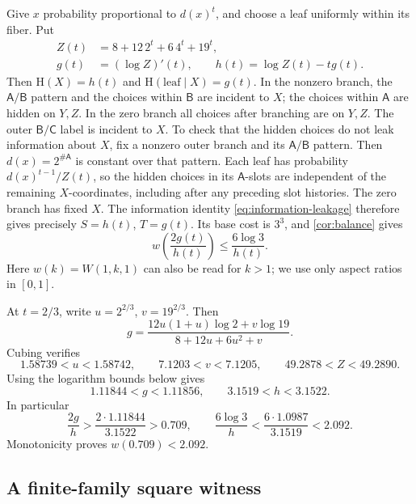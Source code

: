 \documentclass[11pt]{article}
\numberwithin{equation}{section}
\theoremstyle{definition}
\theoremstyle{remark}
\newcommand{\HH}{\mathrm H}
\newcommand{\colA}{\mathsf A}
\newcommand{\colB}{\mathsf B}
\newcommand{\colC}{\mathsf C}
\begin{document}
Give \(x\) probability proportional to \(d(x)^t\), and choose a leaf
uniformly within its fiber.
Put
\begin{equation}\label{eq:curve-functions}
 \begin{split}
 Z(t)&=8+12\,2^t+6\,4^t+19^t,\\
 g(t)&=(\log Z)'(t),\qquad h(t)=\log Z(t)-tg(t).
 \end{split}
\end{equation}
Then \(\HH(X)=h(t)\) and \(\HH(\text{leaf}\mid X)=g(t)\).
In the nonzero branch, the \(\colA/\colB\) pattern and the choices
within \(\colB\) are incident to \(X\); the choices within \(\colA\)
are hidden on \(Y,Z\).
In the zero branch all choices after branching are on \(Y,Z\).
The outer \(\colB/\colC\) label is incident to \(X\).
To check that the hidden choices do not leak information about \(X\),
fix a nonzero outer branch and its \(\colA/\colB\) pattern.
Then \(d(x)=2^{\#\colA}\) is constant over that pattern.
Each leaf has probability \(d(x)^{t-1}/Z(t)\), so the hidden choices
in its \(\colA\)-slots are independent of the remaining
\(X\)-coordinates, including after any preceding slot histories.
The zero branch has fixed \(X\).  The information identity
\eqref{eq:information-leakage} therefore gives precisely
\(S=h(t)\), \(T=g(t)\).
Its base cost is \(3^3\), and \cref{cor:balance} gives
\begin{equation}\label{eq:curve-bound}
 w\!\left(\frac{2g(t)}{h(t)}\right)
       \le\frac{6\log3}{h(t)} .
\end{equation}
Here \(w(k)=W(1,k,1)\) can also be read for \(k>1\);
we use only aspect ratios in \([0,1]\).

At \(t=2/3\), write \(u=2^{2/3}\), \(v=19^{2/3}\).
Then
\[
 g=\frac{12u(1+u)\log2+v\log19}{8+12u+6u^2+v}.
\]
Cubing verifies
\[
 1.58739<u<1.58742,\qquad
 7.1203<v<7.1205,\qquad
 49.2878<Z<49.2890.
\]
Using the logarithm bounds below gives
\[
 1.11844<g<1.11856,\qquad 3.1519<h<3.1522.
\]
In particular
\[
 \frac{2g}{h}>
 \frac{2\cdot1.11844}{3.1522}>0.709,\qquad
 \frac{6\log3}{h}<
 \frac{6\cdot1.0987}{3.1519}<2.092 .
\]
Monotonicity proves \(w(0.709)<2.092\).

\subsection{A finite-family square witness}\label{subsec:square}
\end{document}

